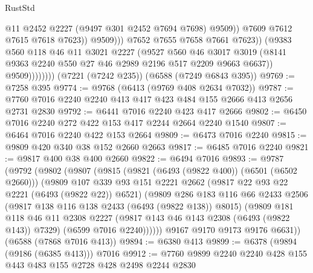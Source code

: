 \begin{lexlean}{RustStd}
\begin{coremodule}
                                    @11
                                    @2452
                                    @2227
                                    (@9497 @301 @2452 @7694 @7698)
                                    @9509))
                                @7609
                                @7612
                                @7615
                                @7618
                                @7623))
                            @9509)))
                      @7652
                      @7655
                      @7658
                      @7661
                      @7623))
                  (@9383
                    @560
                    @118
                    @46
                    @11
                    @3021
                    @2227
                    (@9527
                      @560
                      @46
                      @3017
                      @3019
                      (@8141 @9363 @2240 @550 @27 @46 @2989 @2196 @517 @2209 @9663 @6637))
                    @9509))))))))
    (@7221 (@7242 @235))
    (@6588 (@7249 @6843 @395))
@9769 := @7258 @395
@9774 := @9768 (@6413 (@9769 @408 @2634 @7032))
@9787 := @7760 @7016 @2240 @2240 @413 @417 @423 @484 @155 @2666 @413 @2656 @2731 @2830
@9792 := @6441 @7016 @2240 @423 @417 @2666
@9802 := @6450 @7016 @2240 @272 @422 @153 @417 @2244 @2664 @2240 @1540
@9807 := @6464 @7016 @2240 @422 @153 @2664
@9809 := @6473 @7016 @2240
@9815 := @9809 @420 @340 @38 @152 @2660 @2663
@9817 := @6485 @7016 @2240
@9821 := @9817 @400 @38 @400 @2660
@9822 := @6494 @7016
@9893 := @9787
    (@9792
      (@9802
        (@9807
          (@9815
            (@9821 (@6493 (@9822 @400)) (@6501 (@6502 @2660)))
            (@9809
              @107
              @339
              @93
              @151
              @2221
              @2662
              (@9817 @22 @93 @22 @2221 (@6493 (@9822 @22)) @6521)
              (@9809
                @286
                @183
                @116
                @66
                @2433
                @2506
                (@9817 @138 @116 @138 @2433 (@6493 (@9822 @138)) @8015)
                (@9809
                  @181
                  @118
                  @46
                  @11
                  @2308
                  @2227
                  (@9817 @143 @46 @143 @2308 (@6493 (@9822 @143)) @7329)
                  (@6599 @7016 @2240))))))
        @9167
        @9170
        @9173
        @9176
        @6631))
    (@6588 (@7868 @7016 @413))
@9894 := @6380 @413
@9899 := @6378 (@9894 (@9186 (@6385 @413))) @7016
@9912 := @7760 @9899 @2240 @2240 @428 @155 @443 @483 @155 @2728 @428 @2498 @2244 @2830

\end{coremodule}
\end{lexlean}
